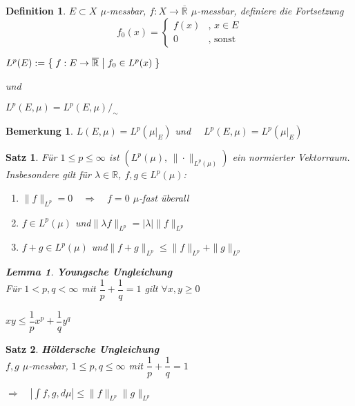 \documentclass[11pt]{memoir}
\theoremstyle{changebreak}
\newtheorem{Definition}{Definition}[chapter]
\newtheorem{Bemerkung}{Bemerkung}[chapter]
\newtheorem{Lemma}{Lemma}[chapter]
\newtheorem{Satz}{Satz}[chapter]
\begin{document}
\begin{Definition}
$E \subset X$ $\mu$-messbar, $f: X \rightarrow \overline{\mathbb R}$ $\mu$-messbar, definiere die Fortsetzung
\begin{equation}
f_0(x) =
\begin{cases}
	f(x) & ,\, x \in E \\
	0 & \text{, sonst}
\end{cases}
\end{equation}
\begin{center}
	$L^p(E) := \Set{f: E \rightarrow \overline{\mathbb R} |f_0 \in L^p(x)}$
\end{center}
und
\begin{center}
	$L^p(E, \mu) = L^p(E, \mu)/_\sim$
\end{center}
\end{Definition}

\begin{Bemerkung}
$L(E, \mu) = L^p(\mu\vert_E)$ \quad und $ \quad L^p(E, \mu) = L^p(\mu\vert_E)$
\end{Bemerkung}

\begin{Satz}
Für $1 \leq p \leq \infty$ ist $(L^p(\mu),\, \|\cdotp\|_{L^p(\mu)})$ ein normierter Vektorraum. Insbesondere gilt für $\lambda \in \mathbb R$, $f, g \in L^p(\mu)$:
\begin{enumerate}
	\item $\|f\|_{L^p} = 0 \quad \Rightarrow\quad  f=0$ $\mu$-fast überall
	\item $f \in L^p(\mu)$ \quad und\quad $\|\lambda f\|_{L^p} = |\lambda|\|f\|_{L^p}$
	\item $f +g \in L^p(\mu)$ \quad und\quad  $\|f + g\|_{L^p} \leq \|f\|_{L^p} + \|g\|_{L^p}$
\end{enumerate}

\begin{Lemma}
\emph{\textbf{Youngsche Ungleichung}} \\
Für $1 < p, q < \infty$ mit $\dfrac{1}{p}+\dfrac{1}{q} =1$ gilt $\forall x, y \geq 0$
\begin{center}
	$xy \leq \dfrac{1}{p}x^p + \dfrac{1}{q}y^q$
\end{center}
\end{Lemma}
\end{Satz}

\begin{Satz}
\emph{\textbf{Höldersche Ungleichung}} \\
$f, g$ $\mu$-messbar, $1 \leq p, q \leq \infty$ mit $\dfrac{1}{p}+\dfrac{1}{q} =1$ \\
\begin{center}
	$\Rightarrow \quad \left| \int f, g, d\mu\right| \leq \|f\|_{L^p}\|g\|_{L^p}$
\end{center}
\end{Satz}
\end{document}
